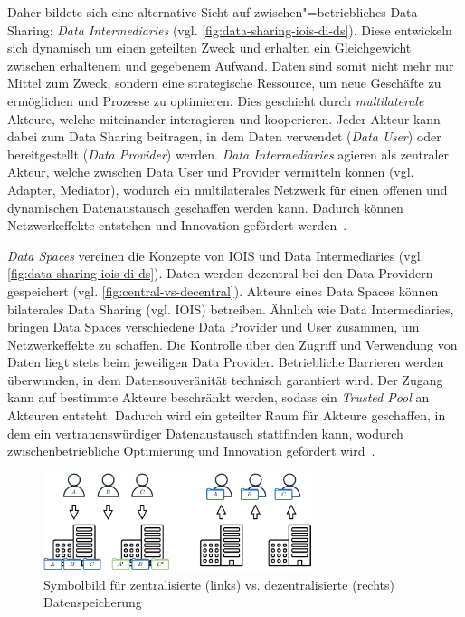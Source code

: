 Daher bildete sich eine alternative Sicht auf zwischen"=betriebliches Data Sharing: \emph{Data Intermediaries} (vgl. \autoref{fig:data-sharing-iois-di-ds}).
Diese entwickeln sich dynamisch um einen geteilten Zweck und erhalten ein Gleichgewicht zwischen erhaltenem und gegebenem Aufwand.
Daten sind somit nicht mehr nur Mittel zum Zweck, sondern eine strategische Ressource, um neue Geschäfte zu ermöglichen und Prozesse zu optimieren.
Dies geschieht durch \emph{multilaterale} Akteure, welche miteinander interagieren und kooperieren.
Jeder Akteur kann dabei zum Data Sharing beitragen, in dem Daten verwendet (\emph{Data User}) oder bereitgestellt (\emph{Data Provider}) werden.
\emph{Data Intermediaries} agieren als zentraler Akteur, welche zwischen Data User und Provider vermitteln können (vgl. Adapter, Mediator), wodurch ein  multilaterales Netzwerk für einen offenen und dynamischen Datenaustausch geschaffen werden kann.
Dadurch können Netzwerkeffekte entstehen und Innovation gefördert werden~\cite{mollerIndustrialDataEcosystems2024}.

\emph{Data Spaces} vereinen die Konzepte von IOIS und Data Intermediaries (vgl. \autoref{fig:data-sharing-iois-di-ds}).
Daten werden dezentral bei den Data Providern gespeichert (vgl. \autoref{fig:central-vs-decentral}).
Akteure eines Data Spaces können bilaterales Data Sharing (vgl. IOIS) betreiben.
Ähnlich wie Data Intermediaries, bringen Data Spaces verschiedene Data Provider und User zusammen, um Netzwerkeffekte zu schaffen.
Die Kontrolle über den Zugriff und Verwendung von Daten liegt stets beim jeweiligen Data Provider.
Betriebliche Barrieren werden überwunden, in dem Datensouveränität technisch garantiert wird.
Der Zugang kann auf bestimmte Akteure beschränkt werden, sodass ein \emph{Trusted Pool} an Akteuren entsteht.
Dadurch wird ein geteilter Raum für Akteure geschaffen, in dem ein vertrauenswürdiger Datenaustausch stattfinden kann, wodurch zwischenbetriebliche Optimierung und Innovation gefördert wird~\cite{mollerIndustrialDataEcosystems2024}.

\begin{figure}[b]
    \includegraphics[width=0.7\textwidth]{./assets/central_vs_decentral.drawio.pdf}
    \caption{Symbolbild für zentralisierte (links) vs. dezentralisierte (rechts) Datenspeicherung}
    \label{fig:central-vs-decentral}
\end{figure}

